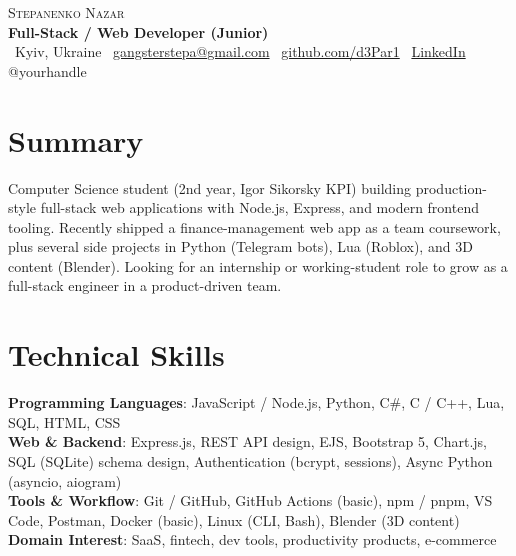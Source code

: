 \documentclass[letterpaper,11pt]{article}
\begin{document}
\begin{center}
    {\Huge \scshape Stepanenko Nazar} \\ \vspace{4pt}
    \small {\color{accent}\textbf{Full-Stack / Web Developer (Junior)}} \\ \vspace{4pt}
    \faMapMarker* \, Kyiv, Ukraine \quad
    \faEnvelope \, \href{mailto:gangsterstepa@gmail.com}{gangsterstepa@gmail.com} \quad
    \faGithub \, \href{https://github.com/d3Par1}{github.com/d3Par1} \quad
    \faLinkedin \, \href{https://www.linkedin.com/in/yourhandle}{LinkedIn} \quad
    \faTelegram \, @yourhandle
\end{center}

\section{Summary}
\small
Computer Science student (2nd year, Igor Sikorsky KPI) building production-style full-stack web applications with Node.js, Express, and modern frontend tooling. Recently shipped a finance-management web app as a team coursework, plus several side projects in Python (Telegram bots), Lua (Roblox), and 3D content (Blender). Looking for an internship or working-student role to grow as a full-stack engineer in a product-driven team.
\vspace{-6pt}

\section{Technical Skills}
\begin{itemize}[leftmargin=0.15in, label={}]
    \small{\item{
     \textbf{Programming Languages}{: JavaScript / Node.js, Python, C\#, C / C++, Lua, SQL, HTML, CSS} \\
     \textbf{Web \& Backend}{: Express.js, REST API design, EJS, Bootstrap 5, Chart.js, SQL (SQLite) schema design, Authentication (bcrypt, sessions), Async Python (asyncio, aiogram)} \\
     \textbf{Tools \& Workflow}{: Git / GitHub, GitHub Actions (basic), npm / pnpm, VS Code, Postman, Docker (basic), Linux (CLI, Bash), Blender (3D content)} \\
     \textbf{Domain Interest}{: SaaS, fintech, dev tools, productivity products, e-commerce}
    }}
\end{itemize}
\vspace{-16pt}
\end{document}
